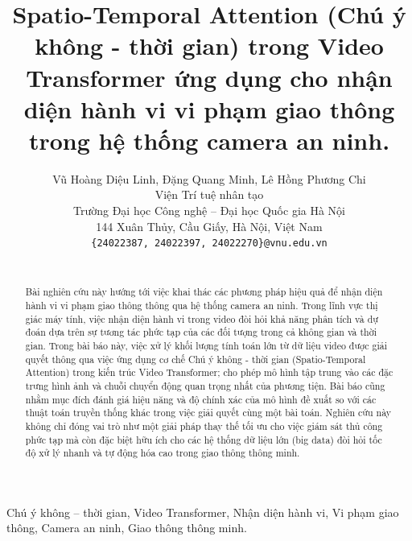\documentclass[a4paper, 10pt, conference]{ieeeconf}      %
\title{\LARGE \bf
Spatio-Temporal Attention (Chú ý không - thời gian) trong Video Transformer ứng dụng cho nhận diện hành vi vi phạm giao thông trong hệ thống camera an ninh.
}
\author{Vũ Hoàng Diệu Linh, Đặng Quang Minh, Lê Hồng Phương Chi%
\\ Viện Trí tuệ nhân tạo \\
Trường Đại học Công nghệ -- Đại học Quốc gia Hà Nội \\
144 Xuân Thủy, Cầu Giấy, Hà Nội, Việt Nam \\
{\tt\small\{24022387, 24022397, 24022270\}@vnu.edu.vn} \\ \\
}
\begin{document}
\maketitle
\thispagestyle{plain}
\pagestyle{plain}



\begin{abstract}

Bài nghiên cứu này hướng tới việc khai thác các phương pháp hiệu quả để nhận diện hành vi vi phạm giao thông thông qua hệ thống camera an ninh. Trong lĩnh vực thị giác máy tính, việc nhận diện hành vi trong video đòi hỏi khả năng phân tích và dự đoán dựa trên sự tương tác phức tạp của các đối tượng trong cả không gian và thời gian. Trong bài báo này, việc xử lý khối lượng tính toán lớn từ dữ liệu video được giải quyết thông qua việc ứng dụng cơ chế Chú ý không - thời gian (Spatio-Temporal Attention) trong kiến trúc Video Transformer; cho phép mô hình tập trung vào các đặc trưng hình ảnh và chuỗi chuyển động quan trọng nhất của phương tiện. Bài báo cũng nhằm mục đích đánh giá hiệu năng và độ chính xác của mô hình đề xuất so với các thuật toán truyền thống khác trong việc giải quyết cùng một bài toán. Nghiên cứu này không chỉ đóng vai trò như một giải pháp thay thế tối ưu cho việc giám sát thủ công phức tạp mà còn đặc biệt hữu ích cho các hệ thống dữ liệu lớn (big data) đòi hỏi tốc độ xử lý nhanh và tự động hóa cao trong giao thông thông minh.\\

\end{abstract}

\begin{keywords}

Chú ý không -- thời gian, Video Transformer, Nhận diện hành vi, Vi phạm giao thông, Camera an ninh, Giao thông thông minh.

\end{keywords}








\newpage
\onecolumn

\end{document}
